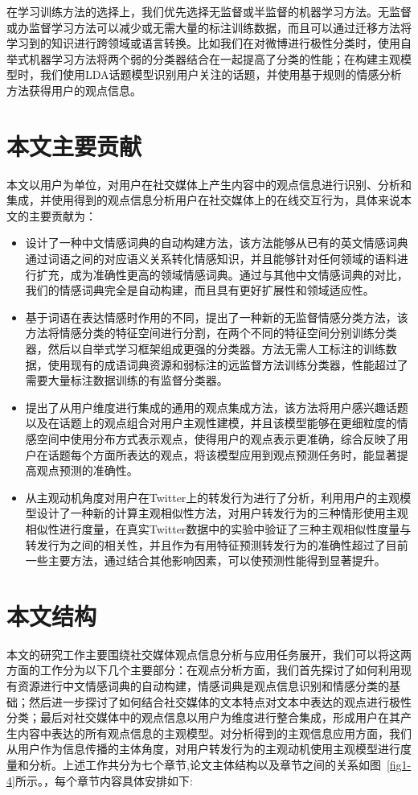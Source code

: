 在学习训练方法的选择上，我们优先选择无监督或半监督的机器学习方法。无监督或办监督学习方法可以减少或无需大量的标注训练数据，而且可以通过迁移方法将学习到的知识进行跨领域或语言转换。比如我们在对微博进行极性分类时，使用自举式机器学习方法将两个弱的分类器结合在一起提高了分类的性能；在构建主观模型时，我们使用LDA话题模型识别用户关注的话题，并使用基于规则的情感分析方法获得用户的观点信息。  

\section{本文主要贡献}
本文以用户为单位，对用户在社交媒体上产生内容中的观点信息进行识别、分析和集成，并使用得到的观点信息分析用户在社交媒体上的在线交互行为，具体来说本文的主要贡献为：
\begin{itemize}
\item 设计了一种中文情感词典的自动构建方法，该方法能够从已有的英文情感词典通过词语之间的对应语义关系转化情感知识，并且能够针对任何领域的语料进行扩充，成为准确性更高的领域情感词典。通过与其他中文情感词典的对比，我们的情感词典完全是自动构建，而且具有更好扩展性和领域适应性。
\item 基于词语在表达情感时作用的不同，提出了一种新的无监督情感分类方法，该方法将情感分类的特征空间进行分割，在两个不同的特征空间分别训练分类器，然后以自举式学习框架组成更强的分类器。方法无需人工标注的训练数据，使用现有的成语词典资源和弱标注的远监督方法训练分类器，性能超过了需要大量标注数据训练的有监督分类器。
\item 提出了从用户维度进行集成的通用的观点集成方法，该方法将用户感兴趣话题以及在话题上的观点组合对用户主观性建模，并且该模型能够在更细粒度的情感空间中使用分布方式表示观点，使得用户的观点表示更准确，综合反映了用户在话题每个方面所表达的观点，将该模型应用到观点预测任务时，能显著提高观点预测的准确性。
\item 从主观动机角度对用户在Twitter上的转发行为进行了分析，利用用户的主观模型设计了一种新的计算主观相似性方法，对用户转发行为的三种情形使用主观相似性进行度量，在真实Twitter数据中的实验中验证了三种主观相似性度量与转发行为之间的相关性，并且作为有用特征预测转发行为的准确性超过了目前一些主要方法，通过结合其他影响因素，可以使预测性能得到显著提升。
\end{itemize}

\section{本文结构}
本文的研究工作主要围绕社交媒体观点信息分析与应用任务展开，我们可以将这两方面的工作分为以下几个主要部分：在观点分析方面，我们首先探讨了如何利用现有资源进行中文情感词典的自动构建，情感词典是观点信息识别和情感分类的基础；然后进一步探讨了如何结合社交媒体的文本特点对文本中表达的观点进行极性分类；最后对社交媒体中的观点信息以用户为维度进行整合集成，形成用户在其产生内容中表达的所有观点信息的主观模型。对分析得到的主观信息应用方面，我们从用户作为信息传播的主体角度，对用户转发行为的主观动机使用主观模型进行度量和分析。上述工作共分为七个章节,论文主体结构以及章节之间的关系如图~\ref{fig1-4}所示。，每个章节内容具体安排如下:


